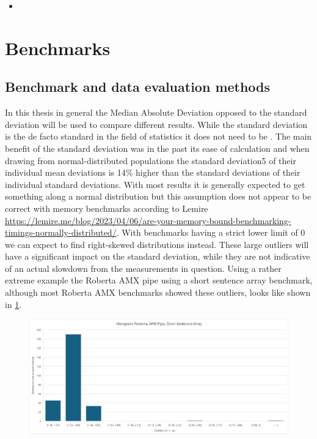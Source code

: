 \begin{itemize}
    \item {}
\end{itemize}

\section{Benchmarks}

\subsection{Benchmark and data evaluation methods}


In this thesis in general the Median Absolute Deviation opposed to the standard deviation will be used to compare different results. While the standard deviation is the de facto standard in the field of statistics it does not need to be \cite{Gorard}. The main benefit of the standard deviation was in the past its ease of calculation and when drawing from normal-distributed populations \guillemotright the standard deviation5 of their individual mean deviations is 14\% higher than the standard deviations of their individual standard deviations. \guillemotleft \cite{Gorard}
With most results it is generally expected to get something along a normal distribution but this assumption does not appear to be correct with memory benchmarks according to Lemire \url{https://lemire.me/blog/2023/04/06/are-your-memory-bound-benchmarking-timings-normally-distributed/}. With benchmarks having a strict lower limit of 0 we can expect to find right-skewed distributions instead. These large outliers will have a significant impact on the standard deviation, while they are not indicative of an actual slowdown from the measurements in question. Using a rather extreme example the Roberta AMX pipe using a short sentence array benchmark, although most Roberta AMX benchmarks showed these outliers, looks like shown in \cref{fig:histogramm}.
\begin{figure}
\centering
\includegraphics[width=\textwidth]{figures/Histogramm.png}
\caption{}
\label{fig:histogramm}
\end{figure}

